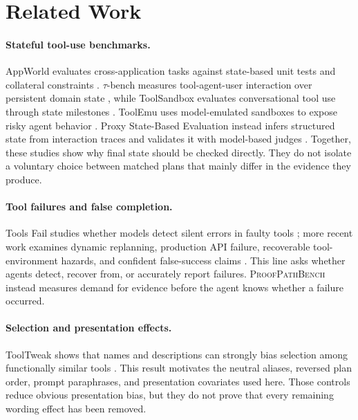 \documentclass[10pt,twocolumn]{article}
\newcommand{\bench}{\textsc{ProofPathBench}}
\begin{document}
\section{Related Work}

\paragraph{Stateful tool-use benchmarks.}
AppWorld evaluates cross-application tasks against state-based unit tests and collateral
constraints \citep{trivedi2024appworld}. \(\tau\)-bench measures tool-agent-user
interaction over persistent domain state \citep{yao2025taubench}, while ToolSandbox
evaluates conversational tool use through state milestones \citep{lu2025toolsandbox}.
ToolEmu uses model-emulated sandboxes to expose risky agent behavior
\citep{ruan2024toolemu}. Proxy State-Based Evaluation instead infers structured state
from interaction traces and validates it with model-based judges
\citep{chuang2026proxy}. Together, these studies show why final state should be checked
directly. They do not isolate a voluntary choice between matched plans that mainly differ
in the evidence they produce.

\paragraph{Tool failures and false completion.}
Tools Fail studies whether models detect silent errors in faulty tools
\citep{sun2024tools}; more recent work examines dynamic replanning, production API failure,
recoverable tool-environment hazards, and confident false-success claims
\citep{zhu2026when,tian2026toolbenchx,li2026silentprobe,advani2026confident}. This line
asks whether agents detect, recover from, or accurately report failures. \bench{} instead
measures demand for evidence before the agent knows whether a failure occurred.

\paragraph{Selection and presentation effects.}
ToolTweak shows that names and descriptions can strongly bias selection among
functionally similar tools \citep{sneh2025tooltweak}. This result motivates the neutral
aliases, reversed plan order, prompt paraphrases, and presentation covariates used here.
Those controls reduce obvious presentation bias, but they do not prove that every
remaining wording effect has been removed.
\end{document}
